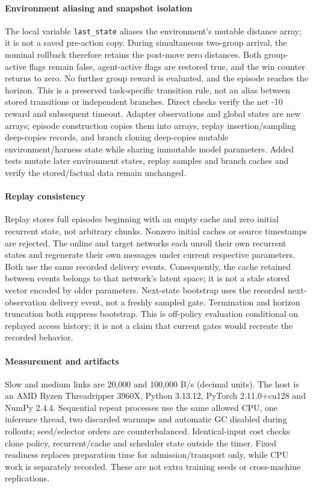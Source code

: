 \documentclass[11pt,a4paper]{article}
\begin{document}
\paragraph{Environment aliasing and snapshot isolation}
The local variable \texttt{last\_state} aliases the environment's mutable distance array; it is not a saved pre-action copy. During simultaneous two-group arrival, the nominal rollback therefore retains the post-move zero distances. Both group-active flags remain false, agent-active flags are restored true, and the win counter returns to zero. No further group reward is evaluated, and the episode reaches the horizon. This is a preserved task-specific transition rule, not an alias between stored transitions or independent branches. Direct checks verify the net -10 reward and subsequent timeout. Adapter observations and global states are new arrays; episode construction copies them into arrays, replay insertion/sampling deep-copies records, and branch cloning deep-copies mutable environment/harness state while sharing immutable model parameters. Added tests mutate later environment states, replay samples and branch caches and verify the stored/factual data remain unchanged.

\paragraph{Replay consistency} Replay stores full episodes beginning with an empty cache and zero initial recurrent state, not arbitrary chunks. Nonzero initial caches or source timestamps are rejected. The online and target networks each unroll their own recurrent states and regenerate their own messages under current respective parameters. Both use the same recorded delivery events. Consequently, the cache retained between events belongs to that network's latent space; it is not a stale stored vector encoded by older parameters. Next-state bootstrap uses the recorded next-observation delivery event, not a freshly sampled gate. Termination and horizon truncation both suppress bootstrap. This is off-policy evaluation conditional on replayed access history; it is not a claim that current gates would recreate the recorded behavior.

\paragraph{Measurement and artifacts}
Slow and medium links are 20,000 and 100,000 B/s (decimal units). The host is an AMD Ryzen Threadripper 3960X, Python 3.13.12, PyTorch 2.11.0+cu128 and NumPy 2.4.4. Sequential repeat processes use the same allowed CPU, one inference thread, two discarded warmups and automatic GC disabled during rollouts; seed/selector orders are counterbalanced. Identical-input cost checks clone policy, recurrent/cache and scheduler state outside the timer. Fixed readiness replaces preparation time for admission/transport only, while CPU work is separately recorded. These are not extra training seeds or cross-machine replications.
\end{document}
